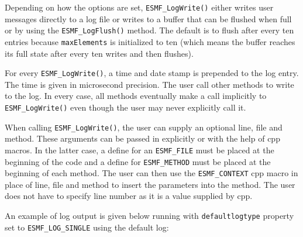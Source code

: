 Depending on how the options are set, {\tt ESMF\_LogWrite()} either writes user
messages directly to a log file or writes to a buffer that can be flushed when 
full or by using the {\tt ESMF\_LogFlush()} method.  The default is to flush 
after every ten entries because {\tt maxElements} is initialized to ten 
(which means the buffer reaches its full state after every ten writes and then
flushes).

For every {\tt ESMF\_LogWrite()}, a time and date stamp is prepended to the
log entry.  The time is given in microsecond precision.  The user call other 
methods to write to the log.  In every case, all methods eventually make a call
implicitly to {\tt ESMF\_LogWrite()} even though the user may never explicitly
call it.

When calling {\tt ESMF\_LogWrite()}, the user can supply an optional line,
file and method.  These arguments can be passed in explicitly or with the help
of cpp macros.  In the latter case, a define for an {\tt ESMF\_FILE} must be 
placed at the beginning of the code and a define for {\tt ESMF\_METHOD} must
be placed at the beginning of each method.  The user can then use the
{\tt ESMF\_CONTEXT} cpp macro in place of line, file and method to insert the 
parameters into the method.  The user does not have to specify line number as
it is a value supplied by cpp.

An example of log output is given below running with {\tt defaultlogtype} 
property set to {\tt ESMF\_LOG\_SINGLE} using the default log:


